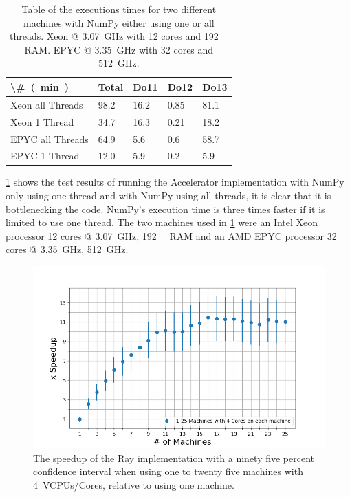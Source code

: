 \documentclass[12pt, a4paper]{article}
\begin{document}
\begin{table}[H]
\centering
    \begin{tabular}{|l|l|l|l|l|}
    \hline
    \SI[parse-numbers=false]{\#}{(\minute)} & Total & Do11  & Do12  & Do13  \\ \hline
    Xeon all Threads                        & 98.2  & 16.2  & 0.85  & 81.1  \\ \hline
    Xeon 1 Thread                           & 34.7  & 16.3  & 0.21  & 18.2  \\ \hline
    EPYC all Threads                        & 64.9  & 5.6   & 0.6   & 58.7  \\ \hline
    EPYC 1 Thread                           & 12.0  & 5.9   & 0.2   & 5.9   \\ \hline
    \end{tabular}
    
    \caption{Table of the executions times for two different machines with NumPy either using one or all threads.
    Xeon @ \SI{3.07}{\giga\hertz} with 12 cores and \SI{192}{\giga\byte} RAM. EPYC @ \SI{3.35}{\giga\hertz} with 32 cores and \SI{512}{\giga\hertz}.}
    \label{Acc:NumPy1Thread}
\end{table}

\cref{Acc:NumPy1Thread} shows the test results of running the Accelerator implementation with NumPy only using one thread and with NumPy using all threads, it is clear that it is bottlenecking the code.
NumPy's execution time is three times faster if it is limited to use one thread.
The two machines used in \cref{Acc:NumPy1Thread} were an Intel Xeon processor 12 cores @ \SI{3.07}{\giga\hertz}, \SI{192}{\giga\byte} RAM and an AMD EPYC processor 32 cores @ \SI{3.35}{\giga\hertz}, \SI{512}{\giga\hertz}.

\begin{figure}[H]
    \centering
    \includegraphics[width=1.0\textwidth, ]{pictures/MachinesXSpeedupWhite.png}
    \caption{The speedup of the Ray implementation with a ninety five percent confidence interval when using one to twenty five machines with \SI{4}{VCPUs/Cores}, relative to using one machine.}
    \label{fig:MachineXSpeedup}
\end{figure}
\end{document}
